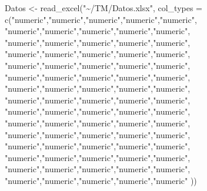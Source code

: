 \documentclass[
  us-letterpaper,
]{scrreprt}
\newenvironment{Shaded}{\begin{snugshade}}{\end{snugshade}}
\newcommand{\AttributeTok}[1]{\textcolor[rgb]{0.40,0.45,0.13}{#1}}
\newcommand{\FunctionTok}[1]{\textcolor[rgb]{0.28,0.35,0.67}{#1}}
\newcommand{\NormalTok}[1]{\textcolor[rgb]{0.00,0.23,0.31}{#1}}
\newcommand{\OtherTok}[1]{\textcolor[rgb]{0.00,0.23,0.31}{#1}}
\newcommand{\StringTok}[1]{\textcolor[rgb]{0.13,0.47,0.30}{#1}}
\theoremstyle{definition}
\theoremstyle{plain}
\theoremstyle{plain}
\theoremstyle{remark}
\begin{document}
\begin{Shaded}
\begin{Highlighting}[]
\NormalTok{Datos }\OtherTok{\textless{}{-}} \FunctionTok{read\_excel}\NormalTok{(}\StringTok{"\textasciitilde{}/TM/Datos.xlsx"}\NormalTok{, }\AttributeTok{col\_types =} 
                  \FunctionTok{c}\NormalTok{(}\StringTok{"numeric"}\NormalTok{,}\StringTok{"numeric"}\NormalTok{,}\StringTok{"numeric"}\NormalTok{,}\StringTok{"numeric"}\NormalTok{,}\StringTok{"numeric"}\NormalTok{,}
                    \StringTok{"numeric"}\NormalTok{,}\StringTok{"numeric"}\NormalTok{,}\StringTok{"numeric"}\NormalTok{,}\StringTok{"numeric"}\NormalTok{,}\StringTok{"numeric"}\NormalTok{, }
                    \StringTok{"numeric"}\NormalTok{,}\StringTok{"numeric"}\NormalTok{,}\StringTok{"numeric"}\NormalTok{,}\StringTok{"numeric"}\NormalTok{,}\StringTok{"numeric"}\NormalTok{, }
                    \StringTok{"numeric"}\NormalTok{,}\StringTok{"numeric"}\NormalTok{,}\StringTok{"numeric"}\NormalTok{,}\StringTok{"numeric"}\NormalTok{,}\StringTok{"numeric"}\NormalTok{, }
                    \StringTok{"numeric"}\NormalTok{,}\StringTok{"numeric"}\NormalTok{,}\StringTok{"numeric"}\NormalTok{,}\StringTok{"numeric"}\NormalTok{,}\StringTok{"numeric"}\NormalTok{, }
                    \StringTok{"numeric"}\NormalTok{,}\StringTok{"numeric"}\NormalTok{,}\StringTok{"numeric"}\NormalTok{,}\StringTok{"numeric"}\NormalTok{,}\StringTok{"numeric"}\NormalTok{, }
                    \StringTok{"numeric"}\NormalTok{,}\StringTok{"numeric"}\NormalTok{,}\StringTok{"numeric"}\NormalTok{,}\StringTok{"numeric"}\NormalTok{,}\StringTok{"numeric"}\NormalTok{, }
                    \StringTok{"numeric"}\NormalTok{,}\StringTok{"numeric"}\NormalTok{,}\StringTok{"numeric"}\NormalTok{,}\StringTok{"numeric"}\NormalTok{,}\StringTok{"numeric"}\NormalTok{, }
                    \StringTok{"numeric"}\NormalTok{,}\StringTok{"numeric"}\NormalTok{,}\StringTok{"numeric"}\NormalTok{,}\StringTok{"numeric"}\NormalTok{,}\StringTok{"numeric"}\NormalTok{,}
                    \StringTok{"numeric"}\NormalTok{,}\StringTok{"numeric"}\NormalTok{,}\StringTok{"numeric"}\NormalTok{,}\StringTok{"numeric"}\NormalTok{,}\StringTok{"numeric"}\NormalTok{, }
                    \StringTok{"numeric"}\NormalTok{,}\StringTok{"numeric"}\NormalTok{,}\StringTok{"numeric"}\NormalTok{,}\StringTok{"numeric"}\NormalTok{,}\StringTok{"numeric"}\NormalTok{, }
                    \StringTok{"numeric"}\NormalTok{,}\StringTok{"numeric"}\NormalTok{,}\StringTok{"numeric"}\NormalTok{,}\StringTok{"numeric"}\NormalTok{,}\StringTok{"numeric"}\NormalTok{, }
                    \StringTok{"numeric"}\NormalTok{,}\StringTok{"numeric"}\NormalTok{,}\StringTok{"numeric"}\NormalTok{,}\StringTok{"numeric"}\NormalTok{,}\StringTok{"numeric"}\NormalTok{, }
                    \StringTok{"numeric"}\NormalTok{,}\StringTok{"numeric"}\NormalTok{,}\StringTok{"numeric"}\NormalTok{,}\StringTok{"numeric"}\NormalTok{,}\StringTok{"numeric"}\NormalTok{, }
                    \StringTok{"numeric"}\NormalTok{,}\StringTok{"numeric"}\NormalTok{,}\StringTok{"numeric"}\NormalTok{,}\StringTok{"numeric"}\NormalTok{,}\StringTok{"numeric"}
\NormalTok{                        ))}


\end{Highlighting}
\end{Shaded}
\end{document}
